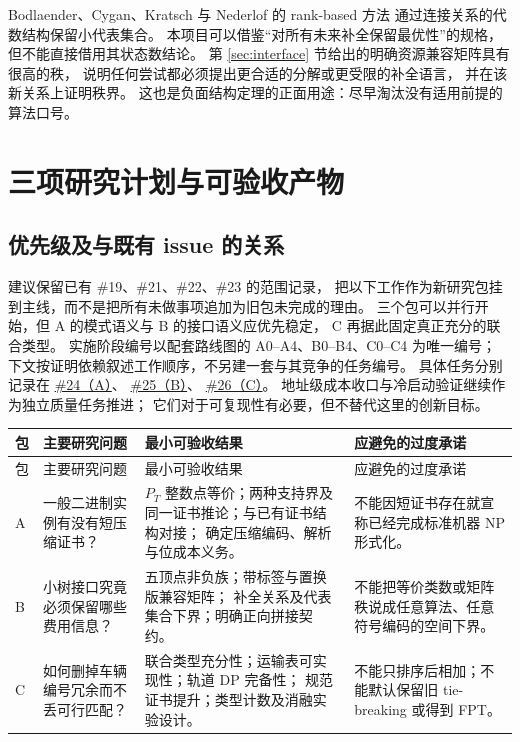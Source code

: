 \documentclass[UTF8,a4paper,11pt,fontset=fandol]{ctexart}
\theoremstyle{definition}
\begin{document}
Bodlaender、Cygan、Kratsch 与 Nederlof 的 rank-based 方法
\cite{bodlaender2015} 通过连接关系的代数结构保留小代表集合。
本项目可以借鉴“对所有未来补全保留最优性”的规格，
但不能直接借用其状态数结论。
第 \ref{sec:interface} 节给出的明确资源兼容矩阵具有很高的秩，
说明任何尝试都必须提出更合适的分解或更受限的补全语言，
并在该新关系上证明秩界。
这也是负面结构定理的正面用途：尽早淘汰没有适用前提的算法口号。

\section{三项研究计划与可验收产物}\label{sec:plan}

\subsection{优先级及与既有 issue 的关系}

建议保留已有 \#19、\#21、\#22、\#23 的范围记录，
把以下工作作为新研究包挂到主线，而不是把所有未做事项追加为旧包未完成的理由。
三个包可以并行开始，但 A 的模式语义与 B 的接口语义应优先稳定，
C 再据此固定真正充分的联合类型。
实施阶段编号以配套路线图的 A0--A4、B0--B4、C0--C4 为唯一编号；
下文按证明依赖叙述工作顺序，不另建一套与其竞争的任务编号。
具体任务分别记录在
\href{https://github.com/huam54925-cpu/uav-routing-certification/issues/24}{\#24（A）}、
\href{https://github.com/huam54925-cpu/uav-routing-certification/issues/25}{\#25（B）}、
\href{https://github.com/huam54925-cpu/uav-routing-certification/issues/26}{\#26（C）}。
地址级成本收口与冷启动验证继续作为独立质量任务推进；
它们对于可复现性有必要，但不替代这里的创新目标。

\begin{longtable}{p{}p{}p{}p{}}
\toprule
包 & 主要研究问题 & 最小可验收结果 & 应避免的过度承诺\\
\midrule
\endfirsthead
\toprule 包 & 主要研究问题 & 最小可验收结果 & 应避免的过度承诺\\ \midrule
\endhead
A &
一般二进制实例有没有短压缩证书？ &
$P_T$ 整数点等价；两种支持界及同一证书推论；与已有证书结构对接；
确定压缩编码、解析与位成本义务。 &
不能因短证书存在就宣称已经完成标准机器 NP 形式化。\\
B &
小树接口究竟必须保留哪些费用信息？ &
五顶点非负族；带标签与置换版兼容矩阵；
补全关系及代表集合下界；明确正向拼接契约。 &
不能把等价类数或矩阵秩说成任意算法、任意符号编码的空间下界。\\
C &
如何删掉车辆编号冗余而不丢可行匹配？ &
联合类型充分性；运输表可实现性；轨道 DP 完备性；
规范证书提升；类型计数及消融实验设计。 &
不能只排序后相加；不能默认保留旧 tie-breaking 或得到 FPT。\\
\bottomrule
\end{longtable}
\end{document}
